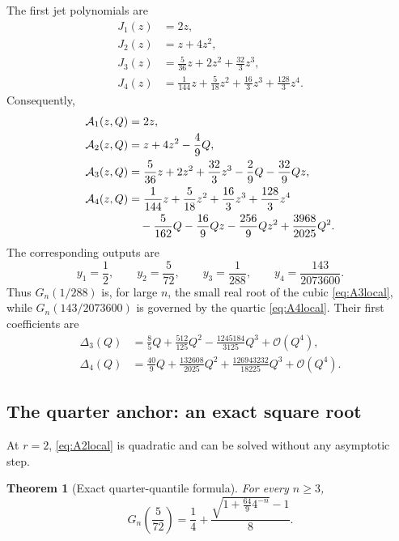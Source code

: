 \documentclass[11pt,oneside]{article}
\numberwithin{equation}{section}
\newtheorem{theorem}{Theorem}[section]
\theoremstyle{definition}
\theoremstyle{remark}
\newcommand{\bigO}{\mathcal O}
\begin{document}
The first jet polynomials are
\begin{align}
 J_1(z)&=2z,\label{eq:J1}\\
 J_2(z)&=z+4z^2,\label{eq:J2}\\
 J_3(z)&=\frac5{36}z+2z^2+\frac{32}{3}z^3,\label{eq:J3}\\
 J_4(z)&=\frac1{144}z+\frac5{18}z^2+\frac{16}{3}z^3+\frac{128}{3}z^4.
 \label{eq:J4}
\end{align}
Consequently,
\begin{align}
 \mathcal A_1(z,Q)&=2z,\label{eq:A1local}\\
 \mathcal A_2(z,Q)&=z+4z^2-\frac49Q,\label{eq:A2local}\\
 \mathcal A_3(z,Q)&=\frac5{36}z+2z^2+\frac{32}{3}z^3
 -\frac29Q-\frac{32}{9}Qz,\label{eq:A3local}\\
 \mathcal A_4(z,Q)&=\frac1{144}z+\frac5{18}z^2+\frac{16}{3}z^3+\frac{128}{3}z^4
 \notag\\
 &\quad-\frac5{162}Q-\frac{16}{9}Qz-\frac{256}{9}Qz^2
 +\frac{3968}{2025}Q^2.
 \label{eq:A4local}
\end{align}
The corresponding outputs are
\begin{equation}
 y_1=\frac12,
 \qquad y_2=\frac5{72},
 \qquad y_3=\frac1{288},
 \qquad y_4=\frac{143}{2073600}.
 \label{eq:y-first}
\end{equation}
Thus $G_n(1/288)$ is, for large $n$, the small real root of the cubic
\eqref{eq:A3local}, while $G_n(143/2073600)$ is governed by the quartic
\eqref{eq:A4local}.  Their first coefficients are
\begin{align}
 \Delta_3(Q)&=\frac85Q+\frac{512}{125}Q^2
 -\frac{1245184}{3125}Q^3+\bigO(Q^4),
 \label{eq:Delta3}\\
 \Delta_4(Q)&=\frac{40}{9}Q+\frac{132608}{2025}Q^2
 +\frac{126943232}{18225}Q^3+\bigO(Q^4).
 \label{eq:Delta4}
\end{align}

\subsection{The quarter anchor: an exact square root}

At $r=2$, \eqref{eq:A2local} is quadratic and can be solved without any
asymptotic step.

\begin{theorem}[Exact quarter-quantile formula]
\label{thm:quarter-exact}
For every $n\ge3$,
\begin{equation}
 \boxed{
 G_n\!\left(\frac5{72}\right)
 =\frac14+\frac{\sqrt{1+\frac{64}{9}4^{-n}}-1}{8}.}
 \label{eq:quarter-exact}
\end{equation}
\end{theorem}
\end{document}
